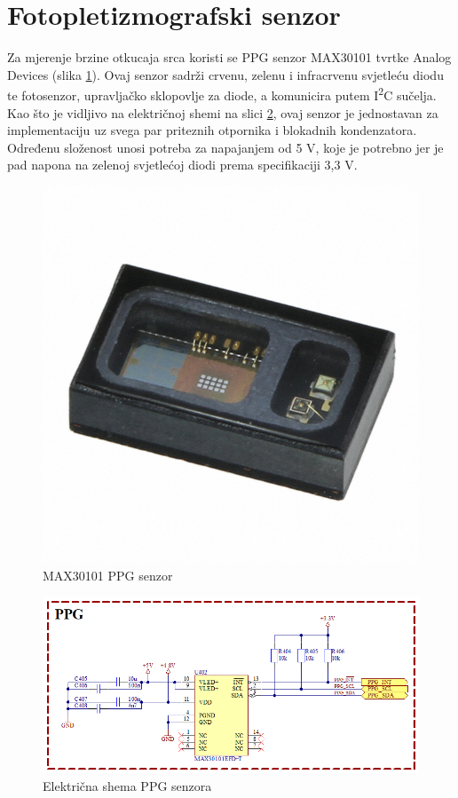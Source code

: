 \newpage
\section{Fotopletizmografski senzor}

Za mjerenje brzine otkucaja srca koristi se PPG senzor MAX30101 tvrtke Analog Devices (slika \ref{slk:MAX30101}). Ovaj senzor sadrži crvenu, zelenu i infracrvenu svjetleću diodu te fotosenzor, upravljačko sklopovlje za diode, a komunicira putem I\textsuperscript{2}C sučelja. Kao što je vidljivo na električnoj shemi na slici \ref{slk:PPG}, ovaj senzor je jednostavan za implementaciju uz svega par priteznih otpornika i blokadnih kondenzatora. Određenu složenost unosi potreba za napajanjem od 5 V, koje je potrebno jer je pad napona na zelenoj svjetlećoj diodi prema specifikaciji 3,3 V.
\begin{figure}[htb]
    \centering
    \includegraphics[width=6 cm]{Figures/MAX30101.JPG}
    \caption{MAX30101 PPG senzor}
    \label{slk:MAX30101}
\end{figure}
\begin{figure}[htb]
    \centering
    \includegraphics[width=\textwidth]{Figures/PPG.png}
    \caption{Električna shema PPG senzora}
    \label{slk:PPG}
\end{figure}

